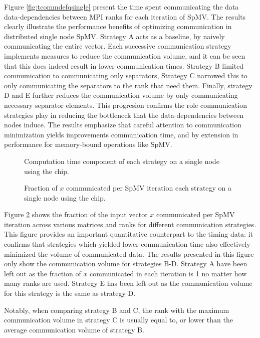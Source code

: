 Figure \ref{fig:tcommdefqsingle} present the time spent communicating the data data-dependencies between MPI ranks for each iteration of SpMV. The results clearly illustrate the performance benefits of optimizing communication in distributed single node SpMV. Strategy A acts as a baseline, by naively communicating the entire vector. Each successive communication strategy implements measures to reduce the communication volume, and it can be seen that this does indeed result in lower communication times. Strategy B limited communication to communicating only separators, Strategy C narrowed this to only communicating the separators to the rank that need them. Finally, strategy D and E further reduces the communication volume by only communicating necessary separator elements. This progresion confirms the role communication strategies play in reducing the bottleneck that the data-dependencies between nodes induce. The results emphasize that careful attention to communication minimization yields improvements communication time, and by extension in performance for memory-bound operations like SpMV.

\begin{figure}[htpb]
    \centering
    \caption{Computation time component of each strategy on a single node using the  chip.}
    \label{fig:tcompdefqsingle}
\end{figure}

\begin{figure}[htpb]
    \centering
    \caption{Fraction of \(x\) communicated per SpMV iteration each strategy on a single node using the  chip.}
    \label{fig:commloaddefqsingle}
\end{figure}
Figure \ref{fig:commloaddefqsingle} shows the fraction of the input vector \(x\) communicated per SpMV iteration across various matrices and ranks for different communication strategies. This figure provides an important quantitative counterpart to the timing data: it confirms that strategies which yielded lower communication time also effectively minimized the volume of communicated data. The results presented in this figure only show the communication volume for strategies B-D. Strategy A have been left out as the fraction of \(x\) communicated in each iteration is 1 no matter how many ranks are used. Strategy E has been left out as the communication volume for this strategy is the same as strategy D.
\medskip

Notably, when comparing strategy B and C, the rank with the maximum communication volume in strategy C is usually equal to, or lower than the average communication volume of strategy B.


